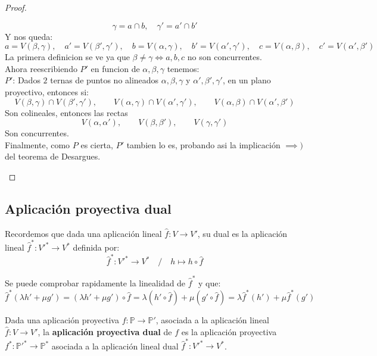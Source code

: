 \begin{proof}
\begin{itemize}
\[            \gamma = a \cap b, \quad \gamma' = a' \cap b'
        \]
        Y nos queda:
        \[
            a = V(\beta, \gamma), \quad a' = V(\beta', \gamma'), \quad
            b = V(\alpha, \gamma), \quad b' = V(\alpha', \gamma'), \quad
            c = V(\alpha, \beta), \quad c' = V(\alpha', \beta')
        \]
        La primera definicion se ve ya que $\beta \neq \gamma \iff a,b,c$ no son concurrentes.\\
        Ahora reescribiendo $P'$ en funcion de $\alpha, \beta, \gamma$ tenemos: \\
        $P'$: Dados $2$ ternas de puntos no alineados $\alpha, \beta, \gamma$ y $\alpha', \beta', \gamma'$, en un plano proyectivo, entonces si:
        \[
        V(\beta, \gamma) \cap V(\beta', \gamma'), \qquad
        V(\alpha, \gamma) \cap V(\alpha', \gamma'), \qquad
        V(\alpha, \beta) \cap V(\alpha', \beta')
        \]
        Son colineales, entonces las rectas
        \[
        V(\alpha, \alpha'), \qquad
        V(\beta, \beta'), \qquad
        V(\gamma, \gamma')
        \]
        Son concurrentes.\\
        Finalmente, como $P$ es cierta, $P'$ tambien lo es, probando asi la implicación $\implies )$ del teorema de Desargues.
    \end{itemize}
\end{proof}

\subsection{Aplicación proyectiva dual}

Recordemos que dada una aplicación lineal $\hat{f}: V \to V'$, su dual es la aplicación lineal $\hat{f}^*: V'^* \to V^*$ definida por:
\[
    \hat{f}^* : V'^* \to V^* \quad / \quad
    h \mapsto h \circ \hat{f}
\]

Se puede comprobar rapidamente la linealidad de $\hat{f}^*$ y que:
\[
\hat{f}^*(\lambda h' + \mu g') =
(\lambda h' + \mu g') \circ \hat{f} =
\lambda (h' \circ \hat{f}) + \mu (g' \circ \hat{f}) =
\lambda \hat{f}^*(h') + \mu \hat{f}^*(g')
\]

\begin{definición}
    Dada una aplicación proyectiva $f: \mathbb{P} \to \mathbb{P}'$, asociada a la aplicación lineal $\hat{f}: V \to V'$, la \textbf{aplicación proyectiva dual} de $f$ es la aplicación proyectiva $f^*: \mathbb{P}'^* \to \mathbb{P}^*$ asociada a la aplicación lineal dual $\hat{f}^*: V'^* \to V^*$.
\end{definición}

